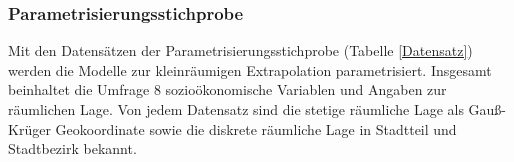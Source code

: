 \documentclass{Vorlage}
\begin{document}
\subsubsection{Parametrisierungsstichprobe}
Mit den Datensätzen der Parametrisierungsstichprobe (Tabelle \ref{Datensatz}) werden die Modelle zur kleinräumigen  Extrapolation parametrisiert. Insgesamt beinhaltet die Umfrage 8 sozioökonomische Variablen und Angaben zur räumlichen Lage. Von jedem Datensatz sind die stetige räumliche Lage als Gauß-Krüger Geokoordinate sowie die diskrete räumliche Lage in Stadtteil und Stadtbezirk bekannt.\\


\begin{table}[h]
\centering
\caption{Erhobene sozioökonomische und geographische Variablen der Parameterisierungsstichprobe und deren Anzahl der Ausprägungen sowie vermutete Modellierung im additiven Modell.}
\label{Datensatz}
\end{table}
\end{document}
